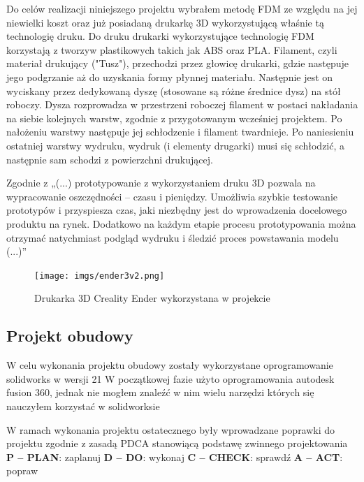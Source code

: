 \documentclass[a4paper,12pt,reqno]{article}
\begin{document}
Do celów realizacji niniejszego projektu wybrałem metodę FDM ze względu \textcolor{to_change}{na jej niewielki koszt oraz} już posiadaną drukarkę 3D wykorzystującą właśnie tą technologię druku. 
Do druku drukarki wykorzystujące technologię FDM korzystają z tworzyw plastikowych takich jak ABS oraz PLA.
Filament, czyli \textcolor{edited}{materiał drukujący} \textcolor{new}{("Tusz")}, przechodzi przez głowicę drukarki, gdzie następuje jego podgrzanie aż do uzyskania formy płynnej materiału. 
Następnie jest on wyciskany przez dedykowaną dyszę (stosowane są różne średnice dysz) na stół roboczy. 
Dysza rozprowadza w przestrzeni roboczej filament w postaci nakładania na siebie kolejnych warstw, zgodnie z przygotowanym wcześniej projektem. 
Po nałożeniu warstwy następuje jej schłodzenie i filament twardnieje. 
Po naniesieniu ostatniej warstwy \textcolor{new}{wydruku}, wydruk \textcolor{new}{(i elementy drugarki) musi się schłodzić, a następnie sam schodzi z powierzchni drukującej}.

Zgodnie z „(...) prototypowanie z wykorzystaniem druku 3D pozwala na wypracowanie oszczędności – czasu i pieniędzy. Umożliwia szybkie testowanie prototypów i przyspiesza czas, jaki niezbędny jest do wprowadzenia docelowego produktu na rynek. Dodatkowo na każdym etapie procesu prototypowania można otrzymać natychmiast podgląd wydruku i śledzić proces powstawania modelu (...)” \cite{prototyp3dzalety}

\begin{figure}[H]%
\centering
\texttt{[image: imgs/ender3v2.png]}
\caption{Drukarka 3D Creality Ender wykorzystana w projekcie \cite{img_by_me} \label{ender3d}}
\quad
\end{figure}

\subsection{Projekt obudowy}
W celu wykonania projektu obudowy zostały wykorzystane oprogramowanie solidworks	 w wersji 21
W początkowej fazie użyto oprogramowania autodesk fusion 360, jednak \textcolor{new}{nie mogłem znaleźć w nim wielu narzędzi których się nauczyłem korzystać w solidworksie}

W ramach wykonania projektu ostatecznego były wprowadzane poprawki do projektu zgodnie z zasadą PDCA stanowiącą podstawę zwinnego projektowania \newline
\textbf{P – PLAN}: zaplanuj \newline
\textbf{D – DO}: wykonaj \newline
\textbf{C – CHECK}: sprawdź \newline
\textbf{A – ACT}: popraw
\end{document}
